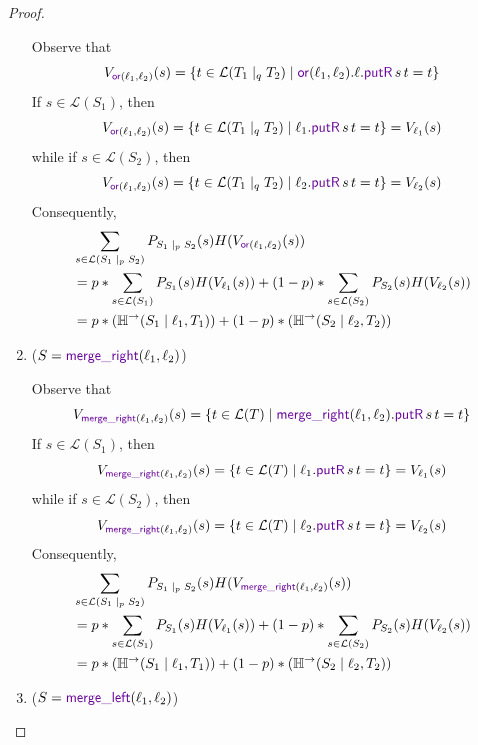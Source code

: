 \documentclass[acmsmall,screen,anonymous]{acmart}
\begin{document}
\begin{proof}
\begin{enumerate}
Observe that 
$$
V_{ \OrLensOf{\Lens_1}{\Lens_2}}(s) = \{t \in \mathcal{L}(T_1 \; |_q \; T_2) \; | \;  \OrLensOf{\Lens_1}{\Lens_2}.\ell.\PutROf{s}{t} = t\}
$$
If $s \in \mathcal{L}(S_1)$, then
$$
V_{ \OrLensOf{\Lens_1}{\Lens_2}}(s) = \{t \in \mathcal{L}(T_1 \; |_q \; T_2) \; | \;  \ell_1.\PutROf{s}{t} = t\} = V_{\ell_1}(s)
$$
while if $s \in \mathcal{L}(S_2)$, then
$$
V_{ \OrLensOf{\Lens_1}{\Lens_2}}(s) = \{t \in \mathcal{L}(T_1 \; |_q \; T_2) \; | \;  \ell_2.\PutROf{s}{t} = t\} = V_{\ell_2}(s)
$$
Consequently,
\begin{align*}
&\sum_{s \in \mathcal{L}(S_1 \; |_p \; S_2)}P_{S_1 \; |_p \; S_2}(s) H(V_{\OrLensOf{\Lens_1}{\Lens_2}}(s))\\
&= p * \sum_{s \in \mathcal{L}(S_1)}P_{S_1}(s) H(V_{\ell_1}(s)) + (1-p) * \sum_{s \in \mathcal{L}(S_2)}P_{S_2}(s) H(V_{\ell_2}(s))\\
&= p * (\mathbb{H}^{\rightarrow}(S_1 \; | \; \ell_1,T_1)) + (1-p) * (\mathbb{H}^{\rightarrow}(S_2 \; | \; \ell_2,T_2))
\end{align*}
\item
($S = \MergeROf{\Lens_1}{\Lens_2}$)

Observe that 
$$
V_{ \MergeROf{\Lens_1}{\Lens_2}}(s) = \{t \in \mathcal{L}(T) \; | \;  \MergeROf{\Lens_1}{\Lens_2}.\PutROf{s}{t} = t\}
$$
If $s \in \mathcal{L}(S_1)$, then
$$
V_{ \MergeROf{\Lens_1}{\Lens_2}}(s) = \{t \in \mathcal{L}(T) \; | \;  \ell_1.\PutROf{s}{t} = t\} = V_{\ell_1}(s)
$$
while if $s \in \mathcal{L}(S_2)$, then
$$
V_{ \MergeROf{\Lens_1}{\Lens_2}}(s) = \{t \in \mathcal{L}(T) \; | \;  \ell_2.\PutROf{s}{t} = t\} = V_{\ell_2}(s)
$$
Consequently,
\begin{align*}
&\sum_{s \in \mathcal{L}(S_1 \; |_p \; S_2)}P_{S_1 \; |_p \; S_2}(s) H(V_{\MergeROf{\Lens_1}{\Lens_2}}(s))\\
&= p * \sum_{s \in \mathcal{L}(S_1)}P_{S_1}(s) H(V_{\ell_1}(s)) + (1-p) * \sum_{s \in \mathcal{L}(S_2)}P_{S_2}(s) H(V_{\ell_2}(s))\\
&= p * (\mathbb{H}^{\rightarrow}(S_1 \; | \; \ell_1,T_1) ) + (1-p) * (\mathbb{H}^{\rightarrow}(S_2 \; | \; \ell_2,T_2) )
\end{align*}
\item
($S = \MergeLOf{\Lens_1}{\Lens_2}$)


\end{enumerate}
\end{proof}
\end{document}
